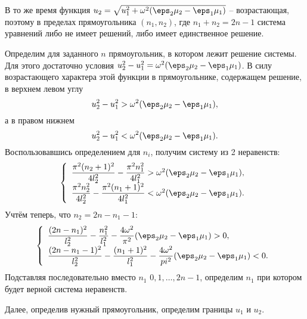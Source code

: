\documentclass[12pt]{hedsemwork}
\renewcommand{\frac}{\dfrac}
\begin{document}
\begin{appendix}
В то же время функция
\( u_2 = \sqrt{u_1^2 + \omega^2(\eps_2\mu_2 - \eps_1\mu_1)} \) -- возрастающая,
поэтому в пределах прямоугольника \( (n_1, n_2) \), где \( n_1 + n_2 = 2n -1 \)
система уравнений либо не имеет решений, либо имеет единственное решение.

Определим для заданного \( n \) прямоугольник, в котором лежит решение системы.
Для этого достаточно условия
\( u_2^2 - u_1^2 = \omega^2(\eps_2\mu_2 - \eps_1\mu_1) \). В силу возрастающего
характера этой функции в прямоугольнике, содержащем решение, в верхнем левом
углу
\[
    u_2^2 - u_1^2 > \omega^2(\eps_2\mu_2 - \eps_1\mu_1),
\]
а в правом нижнем
\[
    u_2^2 - u_1^2 < \omega^2(\eps_2\mu_2 - \eps_1\mu_1).
\]
Воспользовавшись определением для \( n_i \), получим систему из 2 неравенств:
\[
    \left\{
        \begin{array}{l}
            \frac{\pi^2(n_2+1)^2}{4l_2^2} - \frac{\pi^2n_1^2}{4l_1^2} >
            \omega^2(\eps_2\mu_2 - \eps_1\mu_1),\\
            \frac{\pi^2n_2^2}{4l_2^2} - \frac{\pi^2(n_1+1)^2}{4l_1^2} <
            \omega^2(\eps_2\mu_2 - \eps_1\mu_1).
        \end{array}
    \right.
\]
Учтём теперь, что \( n_2 = 2n - n_1 -1 \):
\[
    \left\{
        \begin{array}{l}
            \frac{(2n - n_1)^2}{l_2^2} - \frac{n_1^2}{l_1^2} -
            \frac{4\omega^2}{\pi^2}(\eps_2\mu_2 - \eps_1\mu_1) > 0,\\
            \frac{(2n - n_1 -1)^2}{l_2^2} - \frac{(n_1+1)^2}{l_1^2} -
            \frac{4\omega^2}{pi^2}(\eps_2\mu_2 - \eps_1\mu_1) < 0.
        \end{array}
    \right.
\]
Подставляя последовательно вместо \( n_1 \) \( 0, 1, \ldots, 2n - 1 \),
определим \( n_1 \) при котором будет верной система неравенств.

Далее, определив нужный прямоугольник, определим границы \( u_1 \) и \( u_2 \). 

\end{appendix}
\end{document}
